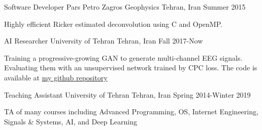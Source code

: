\begin{cventries}
  \cventry
    {Software Developer} %
    {Pars Petro Zagros Geophysics} %
    {Tehran, Iran} %
    {Summer 2015} %
    {
      \begin{cvitems} %
        \item {Highly efficient Ricker estimated deconvolution using C and OpenMP.}
      \end{cvitems}
    }


\end{cventries}



\begin{cventries}

 \cventry
    {AI Researcher} %
    {University of Tehran} %
    {Tehran, Iran} %
    {Fall 2017-Now} %
    {
      \begin{cvitems} %
      	\item {Training a progressive-growing GAN to generate multi-channel EEG signals. Evaluating them with an unsupervised network trained by CPC loss. The code is available at \href{https://github.com/Separius/EEG-GAN}{my github repository}}
      \end{cvitems}
    }

 \cventry
    {Teaching Assistant} %
    {University of Tehran} %
    {Tehran, Iran} %
    {Spring 2014-Winter 2019} %
    {
      \begin{cvitems} %
        \item {TA of many courses including Advanced Programming, OS, Internet Engineering, Signals \& Systems, AI, and Deep Learning}
      \end{cvitems}
    }
\end{cventries}
